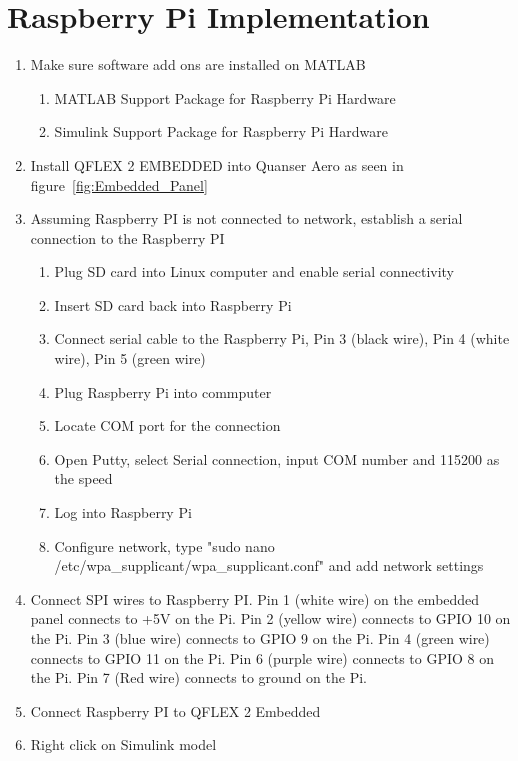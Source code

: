 \section{Raspberry Pi Implementation}
\label{sec:RPItut}
\begin{enumerate}
    \item Make sure software add ons are installed on MATLAB
    \begin{enumerate}
        \item MATLAB Support Package for Raspberry Pi Hardware
        \item Simulink Support Package for Raspberry Pi Hardware
    \end{enumerate}
    \item Install QFLEX 2 EMBEDDED into Quanser Aero as seen in figure~\ref{fig:Embedded_Panel}
    \item Assuming Raspberry PI is not connected to network, establish a serial connection to the Raspberry PI
    \begin{enumerate}
	\item Plug SD card into Linux computer and enable serial connectivity
   	\item Insert SD card back into Raspberry Pi
	\item Connect serial cable to the Raspberry Pi, Pin 3 (black wire), Pin 4 (white wire), Pin 5 (green wire)
	\item Plug Raspberry Pi into commputer
	\item Locate COM port for the connection
	\item Open Putty, select Serial connection, input COM number and 115200 as the speed
	\item Log into Raspberry Pi
	\item Configure network, type "sudo nano /etc/wpa\_supplicant/wpa\_supplicant.conf" and add network settings
    \end{enumerate}
    \item Connect SPI wires to Raspberry PI. Pin 1 (white wire) on the embedded panel connects to +5V on the Pi.  Pin 2 (yellow wire) connects to GPIO 10 on the Pi. Pin 3 (blue wire) connects to GPIO 9 on the Pi.  Pin 4 (green wire) connects to GPIO 11 on the Pi. Pin 6 (purple wire) connects to GPIO 8 on the Pi.  Pin 7 (Red wire) connects to ground on the Pi.
    \item Connect Raspberry PI to QFLEX 2 Embedded
    \item Right click on Simulink model

\end{enumerate}
